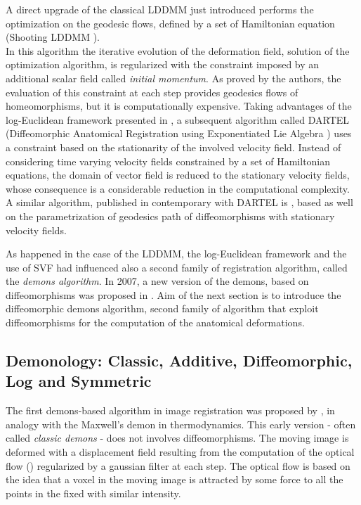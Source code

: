 A direct upgrade of the classical LDDMM just introduced performs the optimization on the geodesic flows, defined by a set of Hamiltonian equation (Shooting LDDMM \cite{vialard2012diffeomorphic}). \\
In this algorithm the iterative evolution of the deformation field, solution of the optimization algorithm, is regularized with the constraint imposed by an additional scalar field called \emph{initial momentum}. 
As proved by the authors, the evaluation of this constraint at each step provides geodesics flows of homeomorphisms, but it is computationally expensive. Taking advantages of the log-Euclidean framework presented in \cite{Arsigny:MRM:06}, a subsequent algorithm called DARTEL (Diffeomorphic Anatomical Registration using Exponentiated Lie Algebra \cite{Ashburner:07}) uses a constraint based on the stationarity of the involved velocity field. Instead of considering time varying velocity fields constrained by a set of Hamiltonian equations, the domain of vector field is reduced to the stationary velocity fields, whose consequence is a considerable reduction in the computational complexity. A similar algorithm, published in contemporary with DARTEL is \cite{hernandez2007registration}, based as well on the parametrization of geodesics path of diffeomorphisms with stationary velocity fields. 

As happened in the case of the LDDMM, the log-Euclidean framework and the use of SVF had influenced also a second family of registration algorithm, called the \emph{demons algorithm}. In 2007, a new version of the demons, based on diffeomorphisms was proposed in \cite{vercauteren2006robust}. Aim of the next section is to introduce the diffeomorphic demons algorithm, second family of algorithm that exploit diffeomorphisms for the computation of the anatomical deformations.


\subsection{Demonology: Classic, Additive, Diffeomorphic, Log and Symmetric}

The first demons-based algorithm in image registration was proposed by \cite{thirion1998image}, in analogy with the Maxwell's demon in thermodynamics. This early version - often called \emph{classic demons} - does not involves diffeomorphisms. 
The moving image is deformed with a displacement field resulting from the computation of the optical flow (\cite{horn1981determining}) regularized by a gaussian filter at each step. The optical flow is based on the idea that a voxel in the moving image is attracted by some force to all the points in the fixed with similar intensity. 

